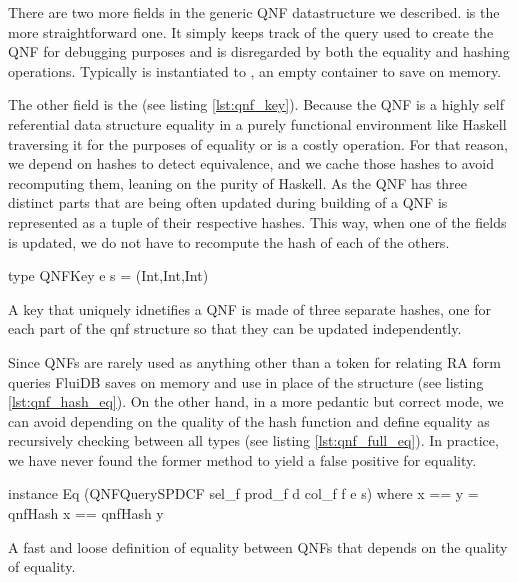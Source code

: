 There are two more fields in the generic QNF datastructure we
described.  is the more
straightforward one. It simply keeps track of the query used to create
the QNF for debugging purposes and is disregarded by both the equality 
and hashing operations. Typically  is
instantiated to , an empty container to save on memory.

The other field is the  (see listing
\ref{lst:qnf_key}). Because the QNF is a highly self referential data
structure equality in a purely functional environment like Haskell traversing it 
for the purposes of equality or is a costly operation. 
For that reason, we depend on hashes to detect equivalence, and we
cache those hashes to avoid recomputing them, leaning on the
purity of Haskell. As the QNF has three distinct parts that
are being often updated during building of a QNF  is 
represented as a tuple of their respective hashes. This way, when one of
the fields is updated, we do not have to recompute the hash of each of the others.

\begin{code}
  \begin{haskellcode}
    type QNFKey e s = (Int,Int,Int)
  \end{haskellcode}
  \caption{\label{lst:qnf_key}A key that uniquely idnetifies a QNF is
    made of three separate hashes, one for each part of the qnf
    structure so that they can be updated independently.}
\end{code}

Since QNFs are rarely used as anything other than a token for relating
RA form queries FluiDB saves on memory and use  in place
of the  structure (see listing
\ref{lst:qnf_hash_eq}). On the other hand, in a more pedantic but
correct mode, we can avoid depending on the quality of the hash
function and define equality as recursively checking between all types
(see listing \ref{lst:qnf_full_eq}). In practice, we have never found the
former method to yield a false positive for equality.

\begin{code}
  \begin{haskellcode}
    instance Eq (QNFQuerySPDCF sel_f prod_f d col_f f e s) where
      x == y = qnfHash x == qnfHash y
  \end{haskellcode}
  \label{lst:qnf_hash_eq}
  \caption{A fast and loose definition of equality between QNFs that depends on the quality of equality.}
\end{code}

